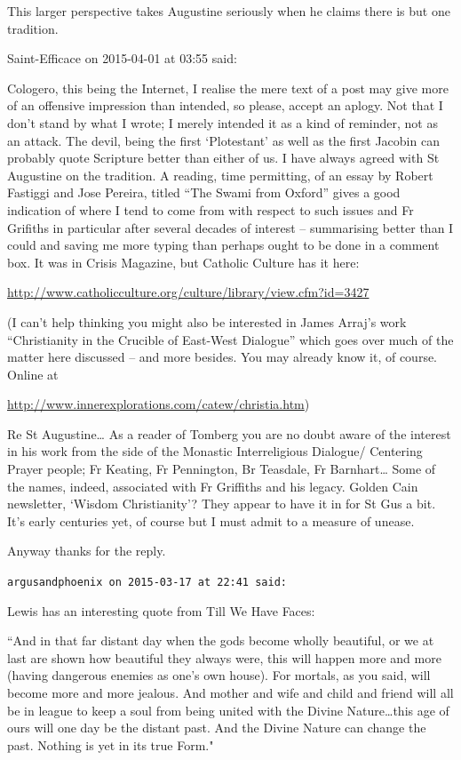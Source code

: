 \begin{footnotesize}
\begin{sffamily}
This larger perspective takes Augustine seriously when he claims there is but one tradition.


\hfill

Saint-Efficace on 2015-04-01 at 03:55 said:

Cologero, this being the Internet, I realise the mere text of a post may give more of an offensive impression than intended, so please, accept an aplogy. Not that I don’t stand by what I wrote; I merely intended it as a kind of reminder, not as an attack.
The devil, being the first ‘Plotestant’ as well as the first Jacobin can probably quote Scripture better than either of us. I have always agreed with St Augustine on the tradition.
A reading, time permitting, of an essay by Robert Fastiggi and Jose Pereira, titled “The Swami from Oxford” gives a good indication of where I tend to come from with respect to such issues and Fr Grifiths in particular after several decades of interest – summarising better than I could and saving me more typing than perhaps ought to be done in a comment box. It was in Crisis Magazine, but Catholic Culture has it here:

\url{http://www.catholicculture.org/culture/library/view.cfm?id=3427}

(I can’t help thinking you might also be interested in James Arraj’s work “Christianity in the Crucible of East-West Dialogue” which goes over much of the matter here discussed – and more besides. You may already know it, of course. Online at

\url{http://www.innerexplorations.com/catew/christia.htm})

Re St Augustine… As a reader of Tomberg you are no doubt aware of the interest in his work from the side of the Monastic Interreligious Dialogue/ Centering Prayer people; Fr Keating, Fr Pennington, Br Teasdale, Fr Barnhart… Some of the names, indeed, associated with Fr Griffiths and his legacy. Golden Cain newsletter, ‘Wisdom Christianity’? They appear to have it in for St Gus a bit. It’s early centuries yet, of course but I must admit to a measure of unease.

Anyway thanks for the reply.

\hfill


\texttt{argusandphoenix on 2015-03-17 at 22:41 said: }

Lewis has an interesting quote from Till We Have Faces:

``And in that far distant day when the gods become wholly beautiful, or we at last are shown how beautiful they always were, this will happen more and more (having dangerous enemies as one's own house). For mortals, as you said, will become more and more jealous. And mother and wife and child and friend will all be in league to keep a soul from being united with the Divine Nature…this age of ours will one day be the distant past. And the Divine Nature can change the past. Nothing is yet in its true Form."



\end{sffamily}
\end{footnotesize}
